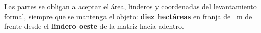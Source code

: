 \documentclass[12pt,a4paper]{article}
\begin{document}
Las partes se obligan a aceptar el área, linderos y coordenadas del levantamiento formal, siempre que se mantenga el objeto: \textbf{diez hectáreas} en franja de \FrenteM\ m de frente desde el \textbf{lindero oeste} de la matriz hacia adentro.

\LugarFecha
{}

\vspace{0.7em}
\noindent
{}
\end{document}
